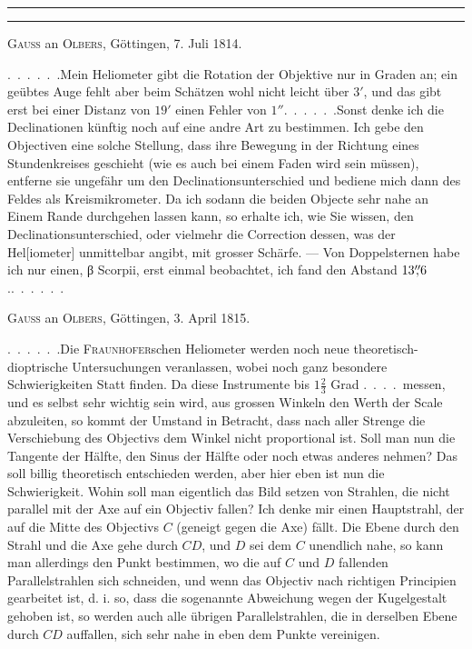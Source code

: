\begin{center}\small\rule{.94\textwidth}{.35pt}\par
[\textsc{Wilhelm Olbers}, Sein Leben und seine Werke, II 1, Berlin 1900, S. 555. 586. 592.]\par
\rule{.94\textwidth}{.35pt}\end{center}
\begin{center}\textsc{Gauss} an \textsc{Olbers}, Göttingen, 7. Juli 1814.\end{center}
\noindent\hspace*{\parindent}\mbox{. . . . . .}\quad Mein Heliometer gibt die Rotation der Objektive nur in Graden an; ein geübtes Auge fehlt aber beim Schätzen wohl nicht leicht über $3'$, und das gibt erst bei einer Distanz von $19'$ einen Fehler von $1''$\mbox{. . . . . .}\quad Sonst denke ich die Declinationen künftig noch auf eine andre Art zu bestimmen. Ich gebe den Objectiven eine solche Stellung, dass ihre Bewegung in der Richtung eines Stundenkreises geschieht (wie es auch bei einem Faden wird sein müssen), entferne sie ungefähr um den Declinationsunterschied und bediene mich dann des Feldes als Kreismikrometer. Da ich sodann die beiden Objecte sehr nahe an Einem Rande durchgehen lassen kann, so erhalte ich, wie Sie wissen, den Declinationsunterschied, oder vielmehr die Correction dessen, was der Hel[iometer] unmittelbar angibt, mit grosser Schärfe. — Von Doppelsternen habe ich nur einen, {\HeliometerGreek β} Scorpii, erst einmal beobachtet, ich fand den Abstand $13\mathord{\overset{\prime\prime}{,}}6$.\quad\mbox{. . . . . .}
\begin{center}\textsc{Gauss} an \textsc{Olbers}, Göttingen, 3. April 1815.\end{center}
\noindent\hspace*{\parindent}\mbox{. . . . . .}\quad Die \textsc{Fraunhofer}schen Heliometer werden noch neue theoretisch-dioptrische Untersuchungen veranlassen, wobei noch ganz besondere Schwierigkeiten Statt finden. Da diese Instrumente bis $1\frac23$ Grad \mbox{. . . .}\ messen, und es selbst sehr wichtig sein wird, aus grossen Winkeln den Werth der
\clearpage{}
\noindent Scale abzuleiten, so kommt der Umstand in Betracht, dass nach aller Strenge die Verschiebung des Objectivs dem Winkel nicht proportional ist. Soll man nun die Tangente der Hälfte, den Sinus der Hälfte oder noch etwas anderes nehmen? Das soll billig theoretisch entschieden werden, aber hier eben ist nun die Schwierigkeit. Wohin soll man eigentlich das Bild setzen von Strahlen, die nicht parallel mit der Axe auf ein Objectiv fallen? Ich denke mir einen Hauptstrahl, der auf die Mitte des Objectivs $C$ (geneigt gegen die Axe) fällt. Die Ebene durch den Strahl und die Axe gehe durch $CD$, und $D$ sei dem $C$ unendlich nahe, so kann man allerdings den Punkt bestimmen, wo die auf $C$ und $D$ fallenden Parallelstrahlen sich schneiden, und wenn das Objectiv nach richtigen Principien gearbeitet ist, d. i. so, dass die sogenannte Abweichung wegen der Kugelgestalt gehoben ist, so werden auch alle übrigen Parallelstrahlen, die in derselben Ebene durch $CD$ auffallen, sich sehr nahe in eben dem Punkte vereinigen.
